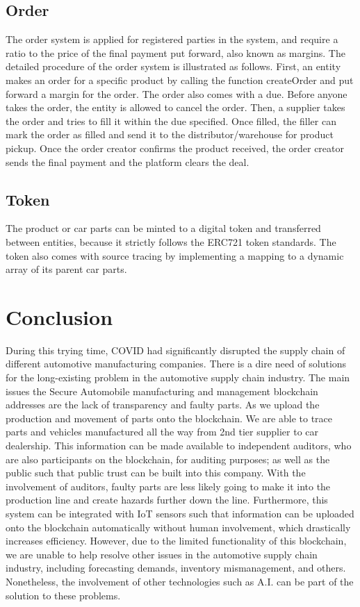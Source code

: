 \documentclass[12pt]{article}
\begin{document}
\subsection{Order}
The order system is applied for registered parties in the system, and require a ratio to the price of the 
final payment put forward, also known as margins. The detailed procedure of the order system is illustrated 
as follows. First, an entity makes an order for a specific product by calling the function createOrder and put forward a margin for the order. 
The order also comes with a due. Before anyone takes the order, the entity is allowed to cancel the order. 
Then, a supplier takes the order and tries to fill it within the due specified. Once filled, the filler can 
mark the order as filled and send it to the distributor/warehouse for product pickup. Once the order creator 
confirms the product received, the order creator sends the final payment and the platform clears the deal.

\subsection{Token}
The product or car parts can be minted to a digital token and transferred between entities, 
because it strictly follows the ERC721 token standards. The token also comes with source tracing 
by implementing a mapping to a dynamic array of its parent car parts.

%

\section{Conclusion}
During this trying time, COVID had significantly disrupted the supply chain of different automotive manufacturing 
companies. There is a dire need of solutions for the long-existing problem in the automotive supply chain industry. 
The main issues the Secure Automobile manufacturing and management blockchain addresses are the lack of transparency 
and faulty parts. As we upload the production and movement of parts onto the blockchain. We are able to trace parts 
and vehicles manufactured all the way from 2nd tier supplier to car dealership. This information can be made available 
to independent auditors, who are also participants on the blockchain, for auditing purposes; as well as the public such 
that public trust can be built into this company. With the involvement of auditors, faulty parts are less likely going 
to make it into the production line and create hazards further down the line. Furthermore, this system can be integrated 
with IoT sensors such that information can be uploaded onto the blockchain automatically without human involvement, which 
drastically increases efficiency. However, due to the limited functionality of this blockchain, we are unable to help 
resolve other issues in the automotive supply chain industry, including forecasting demands, inventory mismanagement, 
and others. Nonetheless, the involvement of other technologies such as A.I. can be part of the solution to these problems.

\pagebreak



\end{document}
